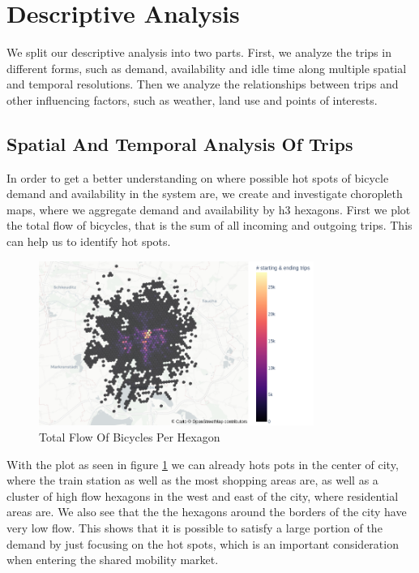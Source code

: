 \section{Descriptive Analysis}
\label{sec:descriptive_analysis}

We split our descriptive analysis into two parts.
First, we analyze the trips in different forms, such as demand, availability and
idle time along multiple spatial and temporal resolutions. Then we analyze the
relationships between trips and other influencing factors, such as weather,
land use and points of interests.


\subsection{Spatial And Temporal Analysis Of Trips}
\label{subsec:descriptive_analysis_spatial_temporal}

In order to get a better understanding on where possible hot spots of bicycle
demand and availability in the system are, we create and investigate choropleth maps,
where we aggregate demand and availability by h3 hexagons.
First we plot the total flow of bicycles, that is the sum of all incoming and
outgoing trips. This can help us to identify hot spots.

\begin{figure}[htb]
    \centering
    \includegraphics[width=0.8\textwidth]{Figures/descriptive_analysis/total_flow.png}
    \caption{Total Flow Of Bicycles Per Hexagon}
    \label{fig:descriptive_analysis_total_flow}
\end{figure}

With the plot as seen in figure \ref{fig:descriptive_analysis_total_flow} we
can already hots pots in the center of city, where the train station as well as
the most shopping areas are, as well as a cluster of high flow hexagons in the
west and east of the city, where residential areas are.
We also see that the the hexagons around the borders of the city have very low flow.
This shows that it is possible to satisfy a large portion of the demand by just focusing on the hot spots, which is an important consideration when entering the shared mobility market.

